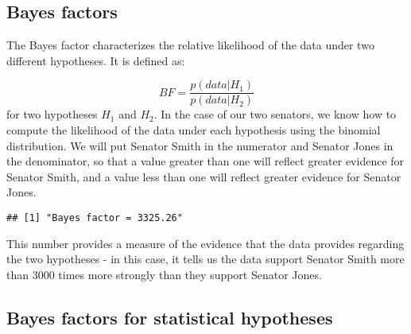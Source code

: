 \documentclass[]{book}
\newenvironment{Shaded}{\begin{snugshade}}{\end{snugshade}}
\newcommand{\KeywordTok}[1]{\textcolor[rgb]{0.13,0.29,0.53}{\textbf{#1}}}
\newcommand{\DataTypeTok}[1]{\textcolor[rgb]{0.13,0.29,0.53}{#1}}
\newcommand{\DecValTok}[1]{\textcolor[rgb]{0.00,0.00,0.81}{#1}}
\newcommand{\FloatTok}[1]{\textcolor[rgb]{0.00,0.00,0.81}{#1}}
\newcommand{\StringTok}[1]{\textcolor[rgb]{0.31,0.60,0.02}{#1}}
\newcommand{\CommentTok}[1]{\textcolor[rgb]{0.56,0.35,0.01}{\textit{#1}}}
\newcommand{\OperatorTok}[1]{\textcolor[rgb]{0.81,0.36,0.00}{\textbf{#1}}}
\newcommand{\NormalTok}[1]{#1}
\theoremstyle{definition}
\theoremstyle{definition}
\theoremstyle{definition}
\theoremstyle{remark}
\begin{document}
\subsection{Bayes factors}\label{bayes-factors}

The Bayes factor characterizes the relative likelihood of the data under
two different hypotheses. It is defined as:

\[
BF = \frac{p(data|H_1)}{p(data|H_2)}
\] for two hypotheses \(H_1\) and \(H_2\). In the case of our two
senators, we know how to compute the likelihood of the data under each
hypothesis using the binomial distribution. We will put Senator Smith in
the numerator and Senator Jones in the denominator, so that a value
greater than one will reflect greater evidence for Senator Smith, and a
value less than one will reflect greater evidence for Senator Jones.

\begin{Shaded}
\end{Shaded}

\begin{verbatim}
## [1] "Bayes factor = 3325.26"
\end{verbatim}

This number provides a measure of the evidence that the data provides
regarding the two hypotheses - in this case, it tells us the data
support Senator Smith more than 3000 times more strongly than they
support Senator Jones.

\subsection{Bayes factors for statistical
hypotheses}\label{bayes-factors-for-statistical-hypotheses}
\end{document}
